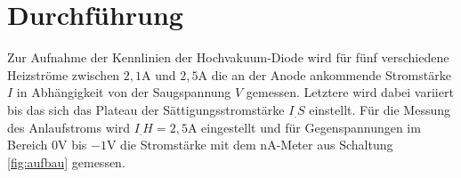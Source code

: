 \section{Durchführung}
\label{sec:Durchführung}

Zur Aufnahme der Kennlinien der Hochvakuum-Diode wird für fünf verschiedene Heizströme zwischen $2,1\si{\ampere}$ und $2,5\si{\ampere}$ die an der Anode ankommende Stromstärke $I$ in Abhängigkeit von der Saugspannung $V$ gemessen. Letztere wird dabei variiert bis das sich das Plateau der Sättigungsstromstärke $I_.S$ einstellt.\newline
\newline
Für die Messung des Anlaufstroms wird $I_.H=2,5\si{\ampere}$ eingestellt und für Gegenspannungen im Bereich $0\si{\volt}$ bis $-1\si{\volt}$ die Stromstärke
mit dem $\si{\nano\ampere}$-Meter aus Schaltung \ref{fig:aufbau} gemessen.